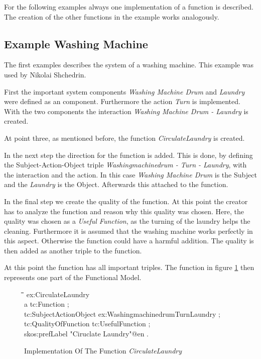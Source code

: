 \documentclass[11pt,a4paper]{article}
\newenvironment{code}{\tt \begin{tabbing}
\hskip12pt\=\hskip12pt\=\hskip12pt\=\hskip12pt\=\hskip5cm\=\hskip5cm\=\kill}
{\end{tabbing}}
\begin{document}
For the following examples always one implementation of a function is
described.  The creation of the other functions in the example works
analogously.

\subsection{Example Washing Machine}

The first examples describes the system of a washing machine.  This example
was used by Nikolai Shchedrin.

First the important system components \textit{Washing Machine Drum} and
\textit{Laundry} were defined as an component.  Furthermore the action
\textit{Turn} is implemented.  With the two components the interaction
\textit{Washing Machine Drum - Laundry} is created.

At point three, as mentioned before, the function \textit{CirculateLaundry} is
created.

In the next step the direction for the function is added.  This is done, by
defining the Subject-Action-Object triple \textit{Washingmachinedrum - Turn -
  Laundry}, with the interaction and the action.  In this case \textit{Washing
  Machine Drum} is the Subject and the \textit{Laundry} is the Object.
Afterwards this attached to the function.

In the final step we create the quality of the function.  At this point the
creator has to analyze the function and reason why this quality was chosen.
Here, the quality was chosen as a \textit{Useful Function}, as the turning of
the laundry helps the cleaning.  Furthermore it is assumed that the washing
machine works perfectly in this aspect.  Otherwise the function could have a
harmful addition.  The quality is then added as another triple to the
function.

At this point the function has all important triples.  The function in figure
\ref{fig:implementation_function_circulate_laundry} then represents one part
of the Functional Model.

\begin{figure}[ht]
  \centering
  \begin{code}
    ex:CirculateLaundry\\
    \> a tc:Function ;\\
    \> tc:SubjectActionObject ex:WashingmachinedrumTurnLaundry ;\\
    \> tc:QualityOfFunction tc:UsefulFunction ;\\
    \> skos:prefLabel "Ciruclate Laundry"@en .\\
  \end{code}
  \caption{Implementation Of The Function \textit{CirculateLaundry}}
  \label{fig:implementation_function_circulate_laundry}
\end{figure}
\end{document}
